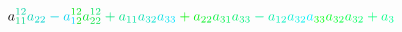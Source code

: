 \documentclass[12pt]{article}
\begin{document}
\begin{displaymath}
{a} _ { \mathcolor[RGB]{0,210,120}{1} \mathcolor[RGB]{0,210,135}{1} } ^ { \mathcolor[RGB]{0,210,150}{1} \mathcolor[RGB]{0,210,165}{2} } \mathcolor[RGB]{0,210,180}{a} _ { \mathcolor[RGB]{0,210,195}{2} \mathcolor[RGB]{0,210,210}{2} } \mathcolor[RGB]{0,210,225}{-} \mathcolor[RGB]{0,210,240}{a} _ { \mathcolor[RGB]{0,210,255}{1} \mathcolor[RGB]{0,225,0}{2} } ^ { \mathcolor[RGB]{0,225,15}{1} \mathcolor[RGB]{0,225,30}{2} } \mathcolor[RGB]{0,225,45}{a} _ { \mathcolor[RGB]{0,225,60}{2} \mathcolor[RGB]{0,225,75}{2} } ^ { \mathcolor[RGB]{0,225,90}{1} \mathcolor[RGB]{0,225,105}{2} } \mathcolor[RGB]{0,225,120}{+} \mathcolor[RGB]{0,225,135}{a} _ { \mathcolor[RGB]{0,225,150}{1} \mathcolor[RGB]{0,225,165}{1} } \mathcolor[RGB]{0,225,180}{a} _ { \mathcolor[RGB]{0,225,195}{3} \mathcolor[RGB]{0,225,210}{2} } \mathcolor[RGB]{0,225,225}{a} _ { \mathcolor[RGB]{0,225,240}{3} \mathcolor[RGB]{0,225,255}{3} } \mathcolor[RGB]{0,240,0}{+} \mathcolor[RGB]{0,240,15}{a} _ { \mathcolor[RGB]{0,240,30}{2} \mathcolor[RGB]{0,240,45}{2} } \mathcolor[RGB]{0,240,60}{a} _ { \mathcolor[RGB]{0,240,75}{3} \mathcolor[RGB]{0,240,90}{1} } \mathcolor[RGB]{0,240,105}{a} _ { \mathcolor[RGB]{0,240,120}{3} \mathcolor[RGB]{0,240,135}{3} } \mathcolor[RGB]{0,240,150}{-} \mathcolor[RGB]{0,240,165}{a} _ { \mathcolor[RGB]{0,240,180}{1} \mathcolor[RGB]{0,240,195}{2} } \mathcolor[RGB]{0,240,210}{a} _ { \mathcolor[RGB]{0,240,225}{3} \mathcolor[RGB]{0,240,240}{2} } \mathcolor[RGB]{0,240,255}{a} _ { \mathcolor[RGB]{0,255,0}{3} \mathcolor[RGB]{0,255,15}{3} } \mathcolor[RGB]{0,255,30}{a} _ { \mathcolor[RGB]{0,255,45}{3} \mathcolor[RGB]{0,255,60}{2} } \mathcolor[RGB]{0,255,75}{a} _ { \mathcolor[RGB]{0,255,90}{3} \mathcolor[RGB]{0,255,105}{2} } \mathcolor[RGB]{0,255,120}{+} \mathcolor[RGB]{0,255,135}{a} _ { \mathcolor[RGB]{0,255,150}{3} } \mathcolor[RGB]{0,255,165}{\,
}
\end{displaymath}
\end{document}
